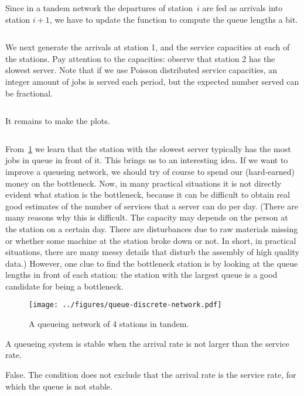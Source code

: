 \documentclass[stochastic-or.tex]{subfiles}
\begin{document}
Since in a tandem network the departures of station~$i$ are fed as arrivals into station $i+1$, we have to update the function to compute the queue lengths a bit.
\inputminted[firstline=135, lastline=144]{python}{../code/discrete_simulations.py} %

We next generate the arrivals at station 1, and the service capacities at each of the stations.
Pay attention to the capacities: observe that station 2 has the slowest server.
Note that if we use Poisson distributed service capacities, an integer amount of jobs is served each period, but the expected number served can be fractional.
\inputminted[firstline=151, lastline=160]{python}{../code/discrete_simulations.py} %

It remains to make the plots.
\inputminted[firstline=164, lastline=182]{python}{../code/discrete_simulations.py} %

From~\cref{fig:tandem} we learn that the station with the slowest server typically has the most jobs in queue in front of it.
This brings us to an interesting idea.
If we want to improve a queueing network, we should try of course to spend our (hard-earned) money on the bottleneck.
Now, in many practical situations it is not directly evident what station is the bottleneck, because it can be difficult to obtain real good estimates of the number of services that a server can do per day.
(There are many reasons why this is difficult.
The capacity may depends on the person at the station on a certain day.
There are disturbances due to raw materials missing or whether some machine at the station broke down or not.
In short, in practical situations, there are many messy details that disturb the assembly of high quality data.)
However, one clue to find the bottleneck station is by looking at the queue lengths in front of each station: the station with the largest queue is a good candidate for being a bottleneck.

\begin{figure}[tb]
\centering
\texttt{[image: ../figures/queue-discrete-network.pdf]}
\caption{A queueing network of 4 stations in tandem.}
\label{fig:tandem}
\end{figure}


\begin{truefalse}
    A queueing system is stable when the arrival rate is not larger than the service rate.
\begin{solution}
        False. The condition does not exclude that the arrival rate is the service rate, for which the queue is not stable.
\end{solution}
\end{truefalse}
\end{document}
